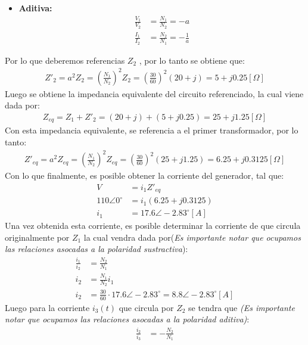 \documentclass[
  11pt,
  letterpaper,
   addpoints,
   answers
  ]{exam}
\begin{document}
\begin{questions}
\begin{solution}
\begin{itemize}
    \item \textbf{Aditiva:}
    \begin{align}
    \frac{V_1}{V_2} &= \frac{N_1}{N_2} = -a \\
    \frac{I_1}{I_2} &= \frac{N_2}{N_1} = -\frac{1}{a}
    \end{align}
\end{itemize}
Por lo que deberemos referencias $Z_{2}$ , por lo tanto se obtiene que:
\begin{align}
    Z'_{2} = a^{2}Z_{2} = \left(\frac{N_{1}}{N_{2}}\right)^{2}Z_{2} = \left(\frac{30}{60}\right)^{2}(20 + j) = 5 + j0.25 [\Omega]
\end{align}
Luego se obtiene la impedancia equivalente del circuito referenciado, la cual viene dada por:
\begin{align}
    Z_{eq}= Z_{1} + Z'_{2}= (20+j) + (5+j0.25) = 25 + j1.25 [\Omega]
\end{align}
Con esta impedancia equivalente, se referencia a el primer transformador, por lo tanto:
\begin{align}
    Z'_{eq}= a^{2}Z_{eq}= \left(\frac{N_{1}}{N_{2}}\right)^{2}Z_{eq} = \left(\frac{30}{60}\right)^{2}(25 + j1.25) = 6.25 + j0.3125 [\Omega]
\end{align}
Con lo que finalmente, es posible obtener la corriente del generador, tal que:
\begin{align}
    V &= i_{1}Z'_{eq}\\
    110\angle 0^{\circ} &= i_{1}(6.25 + j0.3125)\\
    i_{1} &= 17.6\angle -2.83^{\circ} [A]
\end{align}
Una vez obtenida esta corriente, es posible determinar la corriente de que circula originalmente por $Z_{1}$ la cual vendra dada por(\textit{Es importante notar que ocupamos las relaciones asocadas a la polaridad sustractiva}):
\begin{align}
    \frac{i_{1}}{i_{2}} &= \frac{N_{2}}{N_{1}}\\
    i_{2} & = \frac{N_{1}}{N_{2}}i_{1}\\
    i_{2} &= \frac{30}{60} \cdot 17.6\angle -2.83^{\circ} = 8.8\angle -2.83^{\circ} [A]
\end{align}
Luego para la corriente $i_{3}(t)$ que circula por $Z_{2}$ se tendra que \textit{(\textit{Es importante notar que ocupamos las relaciones asocadas a la polaridad aditiva})}:
\begin{align}
    \frac{i_{2}}{i_{3}} &= -\frac{N_{2}}{N_{1}}\\

\end{align}
\end{solution}
\end{questions}
\end{document}
